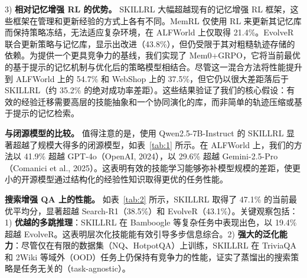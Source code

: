 \documentclass[11pt,UTF8,fontset=fandol]{ctexart}
\begin{document}
3) \textbf{相对记忆增强 RL 的优势。} SKILLRL 大幅超越现有的记忆增强 RL 框架，这些框架在管理和更新经验的方式上各有不同。MemRL 仅使用 RL 来更新其记忆库而保持策略冻结，无法适应复杂环境，在 ALFWorld 上仅取得 21.4\%。EvolveR 联合更新策略与记忆库，显示出改进（43.8\%），但仍受限于其对粗糙轨迹存储的依赖。为提供一个更具竞争力的基线，我们实现了 Mem0+GRPO，它将当前最优的基于提示的记忆机制与优化后的策略模型相结合。尽管这一混合方法将性能提升到 ALFWorld 上的 54.7\% 和 WebShop 上的 37.5\%，但它仍以很大差距落后于 SKILLRL（约 35.2\% 的绝对成功率差距）。这些结果验证了我们的核心假设：有效的经验迁移需要高层的技能抽象和一个协同演化的库，而非简单的轨迹压缩或基于提示的记忆检索。

\textbf{与闭源模型的比较。} 值得注意的是，使用 Qwen2.5-7B-Instruct 的 SKILLRL 显著超越了规模大得多的闭源模型，如表~\ref{tab:1} 所示。在 ALFWorld 上，我们的方法以 41.9\% 超越 GPT-4o（OpenAI, 2024），以 29.6\% 超越 Gemini-2.5-Pro（Comanici et al., 2025）。这表明有效的技能学习能够弥补模型规模的差距，使更小的开源模型通过结构化的经验性知识取得更优的任务性能。

\textbf{搜索增强 QA 上的性能。} 如表~\ref{tab:2} 所示，SKILLRL 取得了 47.1\% 的当前最优平均分，显著超越 Search-R1（38.5\%）和 EvolveR（43.1\%）。关键观察包括：1) \textbf{优越的多跳推理}：SKILLRL 在 Bamboogle 等复杂任务中表现出色，以 19.4\% 超越 EvolveR。这表明层次化技能能有效引导多步信息综合。2) \textbf{强大的泛化能力}：尽管仅在有限的数据集（NQ、HotpotQA）上训练，SKILLRL 在 TriviaQA 和 2Wiki 等域外（OOD）任务上仍保持有竞争力的性能，证实了蒸馏出的搜索策略是任务无关的（task-agnostic）。
\end{document}
